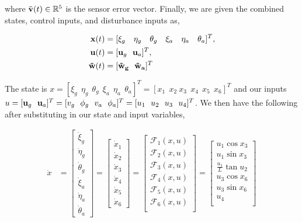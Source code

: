 \documentclass[paper=a4, fontsize=11pt]{scrartcl} %
\numberwithin{equation}{section} %
\numberwithin{figure}{section} %
\numberwithin{table}{section} %
\begin{document}
\begin{framed}
where $\Tilde{\bold{v}}(t) \in \mathbb{R}^5$ is the sensor error vector.  Finally, we are given the combined states, control inputs, and disturbance inputs as,

\begin{align*}
    \bold{x}(t) &= [ \xi_g \ \ \ \eta_g \ \ \ \theta_g \ \ \ \xi_a \ \ \ \eta_a \ \ \ \theta_a ] ^T ,\\
    \bold{u}(t) &= [ \bold{u}_g \ \ \bold{u}_a ]^T ,\\
    \bold{\Tilde{w}}(t) &= [\bold{\Tilde{w}_g \ \ \bold{\Tilde{w}}_a}]^T \\
\end{align*}

The state is $x = [\xi_g \ \  \eta_g \ \  \theta_g \ \  \xi_a \ \  \eta_a \ \ \theta_a ]^T = [ x_1 \ \ x_2 \  x_3 \ \ x_4 \ \ x_5 \ \ x_6 ]^T$ and our inputs $u = [ \bold{u}_g \ \ \bold{u}_a ]^T = [v_g \ \ \phi_g \ \ v_a \ \ \phi_a]^T = [u_1 \ \ u_2 \ \ u_3 \ \ u_4 ]^T$.  We then have the following after substituting in our state and input variables,

\begin{align*}
    \dot{x} &= \begin{bmatrix}
           \dot{\xi}_g \\
           \dot{\eta}_g \\
           \dot{\theta}_g \\
           \dot{\xi}_a \\
           \dot{\eta}_a \\
           \dot{\theta}_a
         \end{bmatrix} 
         =  \begin{bmatrix}
           \dot{x}_1 \\
           \dot{x}_2 \\
           \dot{x}_3 \\
           \dot{x}_4 \\
           \dot{x}_5 \\
           \dot{x}_6
         \end{bmatrix} 
         = \begin{bmatrix}
           \mathcal{F}_1(x,u) \\
           \mathcal{F}_2(x,u) \\
           \mathcal{F}_3(x,u) \\
           \mathcal{F}_4(x,u) \\
           \mathcal{F}_5(x,u) \\
           \mathcal{F}_6(x,u) \\
         \end{bmatrix}
         = \begin{bmatrix}
           u_1 \cos{x_3} \\
           u_1 \sin{x_3} \\
           \frac{u_1}{L} \tan{u_2} \\
           u_3 \cos{x_6} \\
           u_3 \sin{x_6} \\
           u_4 \\
         \end{bmatrix} 
\end{align*}



\end{framed}
\end{document}

